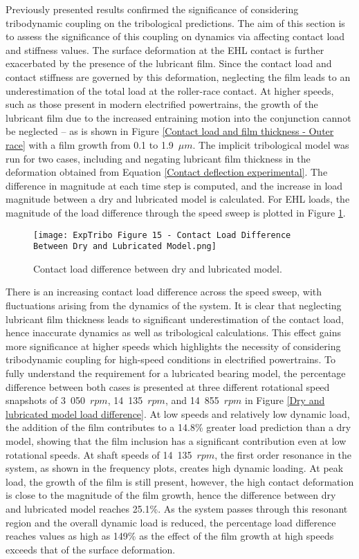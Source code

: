 Previously presented results confirmed the significance of considering tribodynamic coupling on the tribological predictions. The aim of this section is to assess the significance of this coupling on dynamics via affecting contact load and stiffness values. The surface deformation at the EHL contact is further exacerbated by the presence of the lubricant film. Since the contact load and contact stiffness are governed by this deformation, neglecting the film leads to an underestimation of the total load at the roller-race contact. At higher speeds, such as those present in modern electrified powertrains, the growth of the lubricant film due to the increased entraining motion into the conjunction cannot be neglected – as is shown in Figure \ref{Contact load and film thickness - Outer race} with a film growth from 0.1 to 1.9~$\mu m$. The implicit tribological model was run for two cases, including and negating lubricant film thickness in the deformation obtained from Equation \ref{Contact deflection experimental}. The difference in magnitude at each time step is computed, and the increase in load magnitude between a dry and lubricated model is calculated. For EHL loads, the magnitude of the load difference through the speed sweep is plotted in Figure \ref{Contact load difference between dry and lubricated model}.

\begin{figure}
	\texttt{[image: ExpTribo Figure 15 - Contact Load Difference Between Dry and Lubricated Model.png]}
	\caption{Contact load difference between dry and lubricated model.}
	\label{Contact load difference between dry and lubricated model}
\end{figure} 

There is an increasing contact load difference across the speed sweep, with fluctuations arising from the dynamics of the system. It is clear that neglecting lubricant film thickness leads to significant underestimation of the contact load, hence inaccurate dynamics as well as tribological calculations. This effect gains more significance at higher speeds which highlights the necessity of considering tribodynamic coupling for high-speed conditions in electrified powertrains. To fully understand the requirement for a lubricated bearing model, the percentage difference between both cases is presented at three different rotational speed snapshots of 3~050~$rpm$, 14~135~$rpm$, and 14~855~$rpm$ in Figure \ref{Dry and lubricated model load difference}. At low speeds and relatively low dynamic load, the addition of the film contributes to a 14.8\% greater load prediction than a dry model, showing that the film inclusion has a significant contribution even at low rotational speeds. At shaft speeds of 14~135~$rpm$, the first order resonance in the system, as shown in the frequency plots, creates high dynamic loading. At peak load, the growth of the film is still present, however, the high contact deformation is close to the magnitude of the film growth, hence the difference between dry and lubricated model reaches 25.1\%. As the system passes through this resonant region and the overall dynamic load is reduced, the percentage load difference reaches values as high as 149\% as the effect of the film growth at high speeds exceeds that of the surface deformation.

